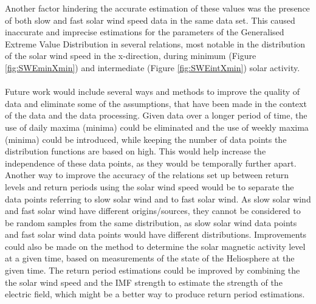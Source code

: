 \documentclass[12pt]{article}
\begin{document}
    Another factor hindering the accurate estimation of these values was the presence of both slow and fast solar wind speed data in the same data set. This caused inaccurate and imprecise estimations for the parameters of the Generalised Extreme Value Distribution in several relations, most notable in the distribution of the solar wind speed in the x-direction, during minimum (Figure \ref{fig:SWEminXmin}) and intermediate (Figure \ref{fig:SWEintXmin}) solar activity.\\ \\
    Future work would include several ways and methods to improve the quality of data and eliminate some of the assumptions, that have been made in the context of the data and the data processing. Given data over a longer period of time, the use of daily maxima (minima) could be eliminated and the use of weekly maxima (minima) could be introduced, while keeping the number of data points the distribution functions are based on high. This would help increase the independence of these data points, as they would be temporally further apart. Another way to improve the accuracy of the relations set up between return levels and return periods using the solar wind speed would be to separate the data points referring to slow solar wind and to fast solar wind. As slow solar wind and fast solar wind have different origins/sources, they cannot be considered to be random samples from the same distribution, as slow solar wind data points and fast solar wind data points would have different distributions. Improvements could also be made on the method to determine the solar magnetic activity level at a given time, based on measurements of the state of the Heliosphere at the given time. The return period estimations could be improved by combining the the solar wind speed and the IMF strength to estimate the strength of the electric field, which might be a better way to produce return period estimations.
\newpage{}



\end{document}
